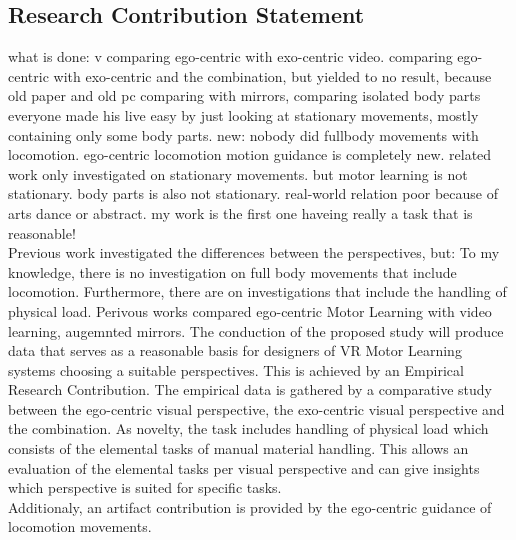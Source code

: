 \subsection{Research Contribution Statement}
\label{delimination_contribution}
what is done:  v
comparing ego-centric with exo-centric video.
comparing ego-centric with exo-centric and the combination, but yielded to no result, because old paper and old pc
comparing with mirrors,
comparing isolated body parts
everyone made his live easy by just looking at stationary movements, mostly containing only some body parts.
new: nobody did fullbody movements with locomotion. ego-centric locomotion motion guidance is completely new. 
related work only investigated on stationary movements. but motor learning is not stationary. body parts is also not stationary.
real-world relation poor because of arts dance or abstract. my work is the first one haveing really a task that is reasonable!\\
Previous work investigated the differences between the perspectives, but:
To my knowledge, there is no investigation on full body movements that include locomotion. Furthermore, there are on investigations that include the handling of physical load.
Perivous works compared ego-centric Motor Learning with video learning\cite{YouMove,vrdancetrainer}, augemnted mirrors\cite{perspectivematters,onebody}.
The conduction of the proposed study will produce data that serves as a reasonable basis for designers of VR Motor Learning systems choosing a suitable perspectives. This is achieved by an Empirical Research Contribution. The empirical data is gathered by a comparative study between the ego-centric visual perspective, the exo-centric visual perspective and the combination. As novelty, the task includes handling of physical load which consists of the elemental tasks of manual material handling. This allows an evaluation of the elemental tasks per visual perspective and can give insights which perspective is suited for specific tasks.\\
Additionaly, an artifact contribution is provided by the ego-centric guidance of locomotion movements.


